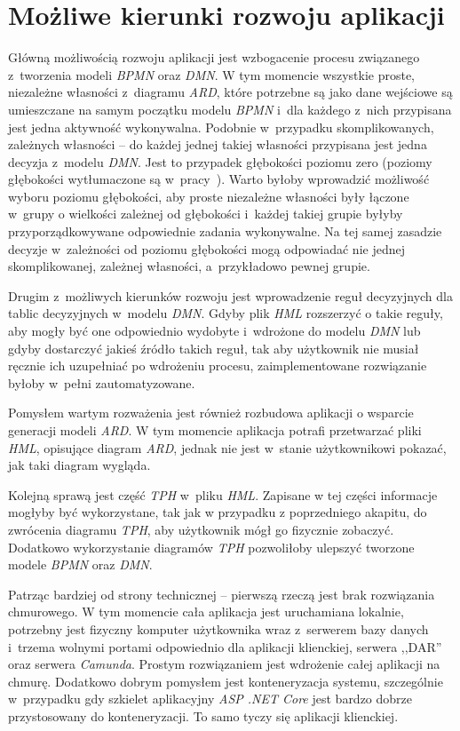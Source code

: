 \section{Możliwe kierunki rozwoju aplikacji}
\label{sec:rozwójAplikacji}
Główną możliwością rozwoju aplikacji jest wzbogacenie procesu związanego z~tworzenia modeli \emph{BPMN} oraz \emph{DMN}. W tym momencie wszystkie proste, niezależne własności z~diagramu \emph{ARD}, które potrzebne są jako dane wejściowe są umieszczane na samym początku modelu \emph{BPMN} i~dla każdego z~nich przypisana jest jedna aktywność wykonywalna. Podobnie w~przypadku skomplikowanych, zależnych własności -- do każdej jednej takiej własności przypisana jest jedna decyzja z~modelu \emph{DMN}. Jest to przypadek głębokości poziomu zero (poziomy głębokości wytłumaczone są w~pracy~\cite{ARDtoBPM}). Warto byłoby wprowadzić możliwość wyboru poziomu głębokości, aby proste niezależne własności były łączone w~grupy o wielkości zależnej od głębokości i~każdej takiej grupie byłyby przyporządkowywane odpowiednie zadania wykonywalne. Na tej samej zasadzie decyzje w~zależności od poziomu głębokości mogą odpowiadać nie jednej skomplikowanej, zależnej własności, a~przykładowo pewnej grupie. 

Drugim z~możliwych kierunków rozwoju jest wprowadzenie reguł decyzyjnych dla tablic decyzyjnych w~modelu \emph{DMN}. Gdyby plik \emph{HML} rozszerzyć o takie reguły, aby mogły być one odpowiednio wydobyte i~wdrożone do modelu \emph{DMN} lub gdyby dostarczyć jakieś źródło takich reguł, tak aby użytkownik nie musiał ręcznie ich uzupełniać po wdrożeniu procesu, zaimplementowane rozwiązanie byłoby w~pełni zautomatyzowane.

Pomysłem wartym rozważenia jest również rozbudowa aplikacji o wsparcie generacji modeli \emph{ARD}. W tym momencie aplikacja potrafi przetwarzać pliki \emph{HML}, opisujące diagram \emph{ARD}, jednak nie jest w~stanie użytkownikowi pokazać, jak taki diagram wygląda.

Kolejną sprawą jest część \emph{TPH} w~pliku \emph{HML}. Zapisane w tej części informacje mogłyby być wykorzystane, tak jak w przypadku z poprzedniego akapitu, do zwrócenia diagramu \emph{TPH}, aby użytkownik mógł go fizycznie zobaczyć. Dodatkowo wykorzystanie diagramów \emph{TPH} pozwoliłoby ulepszyć tworzone modele \emph{BPMN} oraz \emph{DMN}.

Patrząc bardziej od strony technicznej -- pierwszą rzeczą jest brak rozwiązania chmurowego. W tym momencie cała aplikacja jest uruchamiana lokalnie, potrzebny jest fizyczny komputer użytkownika wraz z~serwerem bazy danych i~trzema wolnymi portami odpowiednio dla aplikacji klienckiej, serwera ,,DAR'' oraz serwera \emph{Camunda}. Prostym rozwiązaniem jest wdrożenie całej aplikacji na chmurę. Dodatkowo dobrym pomysłem jest konteneryzacja systemu, szczególnie w~przypadku gdy szkielet aplikacyjny \emph{ASP .NET Core} jest bardzo dobrze przystosowany do konteneryzacji. To samo tyczy się aplikacji klienckiej. 

